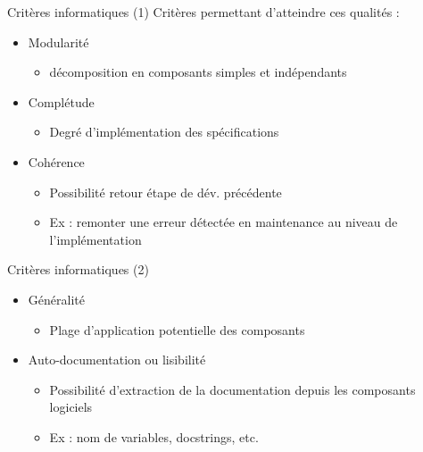 \documentclass[14pt]{beamer}
\begin{document}
\begin{framentitle}{Critères informatiques (1)}
    Critères permettant d'atteindre ces qualités :
    \begin{itemize}
        \item Modularité
            \begin{itemize}
                \item décomposition en composants simples et indépendants
            \end{itemize}
        \item Complétude
            \begin{itemize}
                \item Degré d'implémentation des spécifications
            \end{itemize}
        \item Cohérence
            \begin{itemize}
                \item Possibilité retour étape de dév. précédente
                \item Ex : remonter une erreur détectée en maintenance au niveau
                    de l'implémentation
            \end{itemize}
    \end{itemize}
\end{framentitle}
\begin{framentitle}{Critères informatiques (2)}
    \begin{itemize}
        \item Généralité
            \begin{itemize}
                \item Plage d'application potentielle des composants
            \end{itemize}
        \item Auto-documentation ou lisibilité
            \begin{itemize}
                \item Possibilité d'extraction de la documentation depuis les
                    composants logiciels
                \item Ex : nom de variables, docstrings, etc.
            \end{itemize}
    \end{itemize}
\end{framentitle}
\end{document}
